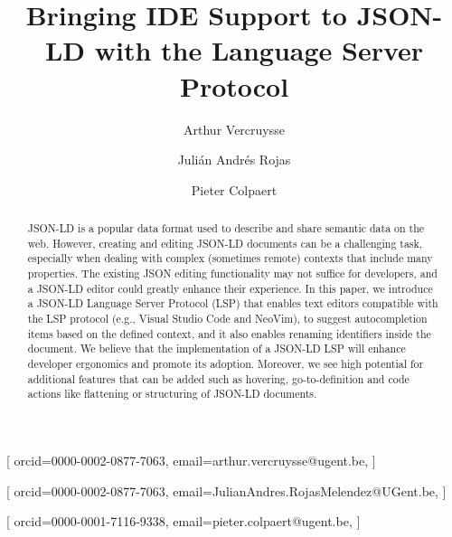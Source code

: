 \documentclass[
]{ceurart}
\begin{document}


\title{Bringing IDE Support to JSON-LD with the Language Server Protocol}


\author[1]{Arthur Vercruysse}[%
orcid=0000-0002-0877-7063,
email=arthur.vercruysse@ugent.be,
]
\author[1]{Julián Andrés Rojas}[%
orcid=0000-0002-0877-7063,
email=JulianAndres.RojasMelendez@UGent.be,
]
\author[1]{Pieter Colpaert}[%
orcid=0000-0001-7116-9338,
email=pieter.colpaert@ugent.be,
]
\cormark[1]
\fnmark[1]
\address[1]{IDLab, Department of Electronics and Information Systems, Ghent University – imec}


\begin{abstract}
  JSON-LD is a popular data format used to describe and share semantic data on the web.
  However, creating and editing JSON-LD documents can be a challenging task, especially when dealing with complex (sometimes remote) contexts that include many properties.
  The existing JSON editing functionality may not suffice for developers, and a JSON-LD editor could greatly enhance their experience.
  In this paper, we introduce a JSON-LD Language Server Protocol (LSP) that enables text editors compatible with the LSP protocol (e.g., Visual Studio Code and NeoVim), to suggest autocompletion items based on the defined context, and it also enables renaming identifiers inside the document.
  We believe that the implementation of a JSON-LD LSP will enhance developer ergonomics and promote its adoption.
  Moreover, we see high potential for additional features that can be added such as hovering, go-to-definition and code actions like flattening or structuring of JSON-LD documents.
\end{abstract}
\end{document}
